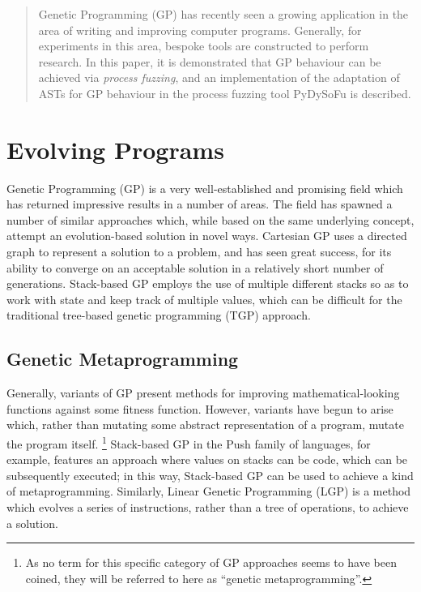 \documentclass[draft,12pt]{llncs} %
\begin{document}
\maketitle

\begin{abstract}
  Genetic Programming (GP) has recently seen a growing application in the area
  of writing and improving computer programs. Generally, for experiments in this
  area, bespoke tools are constructed to perform research. In this paper, it is
  demonstrated that GP behaviour can be achieved via \emph{process fuzzing}, and
  an implementation of the adaptation of ASTs for GP behaviour in the process
  fuzzing tool PyDySoFu is described.
\end{abstract}


\section{Evolving Programs} Genetic Programming (GP) is a very well-established
and promising field which has returned impressive results in a number of areas.
The field has spawned a number of similar approaches which, while based on the
same underlying concept, attempt an evolution-based solution in novel ways.
Cartesian GP\cite{miller2011cartesian} uses a directed graph to represent a
solution to a problem, and has seen great success, for its ability to converge
on an acceptable solution in a relatively short number of generations.
Stack-based GP\cite{perkis1994stack} employs the use of multiple different
stacks so as to work with state and keep track of multiple values, which can be
difficult for the traditional tree-based genetic programming (TGP) approach.\par

\subsection{Genetic Metaprogramming} Generally, variants of GP present methods
for improving mathematical-looking functions against some fitness function.
However, variants have begun to arise which, rather than mutating some abstract
representation of a program, mutate the program itself. \footnote{As no term for
this specific category of GP
  approaches seems to have been coined, they will be referred to here as
  ``genetic metaprogramming''.} Stack-based GP in the Push family of
languages\cite{spector2001autoconstructive}, for example, features an approach
where values on stacks can be code, which can be subsequently executed; in this
way, Stack-based GP can be used to achieve a kind of metaprogramming. Similarly,
Linear Genetic Programming\cite{brameier2007linear} (LGP) is a method which
evolves a series of instructions, rather than a tree of operations, to achieve a
solution.\par
\end{document}
